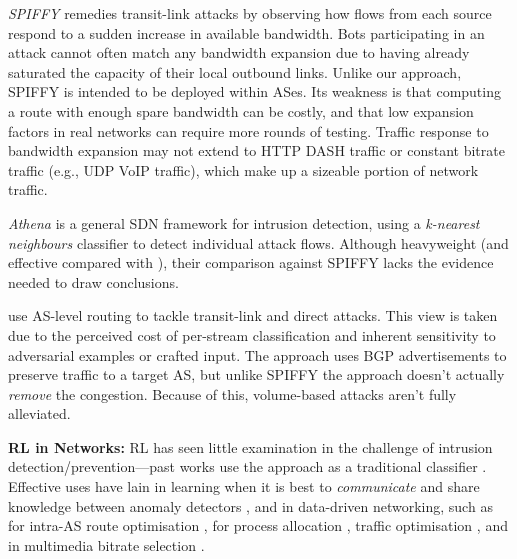 \documentclass[10pt, times, conference, letterpaper]{IEEEtran}
\newcommand{\fakepara}[1]{\noindent\textbf{#1:}}
\begin{document}
\emph{SPIFFY} \cite{DBLP:conf/ndss/KangGS16} remedies transit-link attacks by observing how flows from each source respond to a sudden increase in available bandwidth.
Bots participating in an attack cannot often match any bandwidth expansion due to having already saturated the capacity of their local outbound links.
Unlike our approach, SPIFFY is intended to be deployed within ASes.
Its weakness is that computing a route with enough spare bandwidth can be costly, and that low expansion factors in real networks can require more rounds of testing. 
Traffic response to bandwidth expansion may not extend to HTTP DASH traffic or constant bitrate traffic (e.g., UDP VoIP traffic), which make up a sizeable portion of network traffic.

\emph{Athena} \cite{DBLP:conf/dsn/LeeKSPY17} is a general SDN framework for intrusion detection, using a \emph{k-nearest neighbours} classifier to detect individual attack flows.
Although heavyweight (and effective compared with \textcite{DBLP:conf/lcn/BragaMP10}), their comparison against SPIFFY lacks the evidence needed to draw conclusions.

\Textcite{DBLP:conf/sp/SmithS18} use AS-level routing to tackle transit-link and direct attacks.
This view is taken due to the perceived cost of per-stream classification and inherent sensitivity to adversarial examples or crafted input.
The approach uses BGP advertisements to preserve traffic to a target AS, but unlike SPIFFY the approach doesn't actually \emph{remove} the congestion.
Because of this, volume-based attacks aren't fully alleviated.

\fakepara{RL in Networks}
RL has seen little examination in the challenge of intrusion detection/prevention---past works use the approach as a traditional classifier \cite{shamshirband2014anomaly,DBLP:conf/mates/ServinK08}.
Effective uses have lain in learning when it is best to \emph{communicate} and share knowledge between anomaly detectors \cite{DBLP:conf/paisi/XuSH07}, and in data-driven networking, such as for intra-AS route optimisation \cite{DBLP:conf/hotnets/ValadarskySST17}, for process allocation \cite{DBLP:conf/hotnets/MaoAMK16}, traffic optimisation \cite{DBLP:conf/sigcomm/ChenL0L18}, and in multimedia bitrate selection \cite{DBLP:conf/sigcomm/MaoNA17}.
\end{document}
